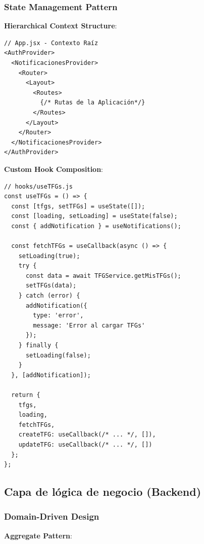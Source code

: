 \documentclass[12pt,a4paper,oneside]{report}
\begin{document}
\subsubsection{State Management Pattern}\label{state-management-pattern}

\textbf{Hierarchical Context Structure}:

\begin{lstlisting}
// App.jsx - Contexto Raíz
<AuthProvider>
  <NotificacionesProvider>
    <Router>
      <Layout>
        <Routes>
          {/* Rutas de la Aplicación*/}
        </Routes>
      </Layout>
    </Router>
  </NotificacionesProvider>
</AuthProvider>
\end{lstlisting}

\textbf{Custom Hook Composition}:

\begin{lstlisting}
// hooks/useTFGs.js
const useTFGs = () => {
  const [tfgs, setTFGs] = useState([]);
  const [loading, setLoading] = useState(false);
  const { addNotification } = useNotifications();
  
  const fetchTFGs = useCallback(async () => {
    setLoading(true);
    try {
      const data = await TFGService.getMisTFGs();
      setTFGs(data);
    } catch (error) {
      addNotification({
        type: 'error',
        message: 'Error al cargar TFGs'
      });
    } finally {
      setLoading(false);
    }
  }, [addNotification]);
  
  return {
    tfgs,
    loading,
    fetchTFGs,
    createTFG: useCallback(/* ... */, []),
    updateTFG: useCallback(/* ... */, [])
  };
};
\end{lstlisting}

\subsection{Capa de lógica de negocio
(Backend)}\label{capa-de-luxf3gica-de-negocio-backend}

\subsubsection{Domain-Driven Design}\label{domain-driven-design}

\textbf{Aggregate Pattern}:
\end{document}
